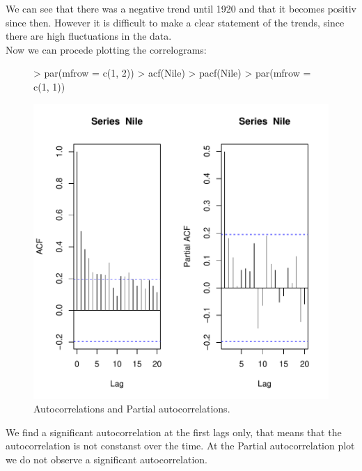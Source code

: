 \documentclass[11pt, a4paper]{article} %
\begin{document}
\noindent We can see that there was a negative trend until 1920 and that it becomes positiv since then. However it is difficult to make a clear statement of the trends, since there are high fluctuations in the data.\\


\noindent Now we can procede plotting the correlograms:
\begin{figure}
\centering
\begin{Schunk}
\begin{Sinput}
> par(mfrow = c(1, 2))
> acf(Nile)
> pacf(Nile)
> par(mfrow = c(1, 1))
\end{Sinput}
\end{Schunk}
\includegraphics{alles-035}
\caption{Autocorrelations and Partial autocorrelations.}
\end{figure}

\noindent We find a significant autocorrelation at the first lags only, that means that the autocorrelation is not constanst over the time. 
At the Partial autocorrelation plot we do not observe a significant autocorrelation. 
\end{document}
